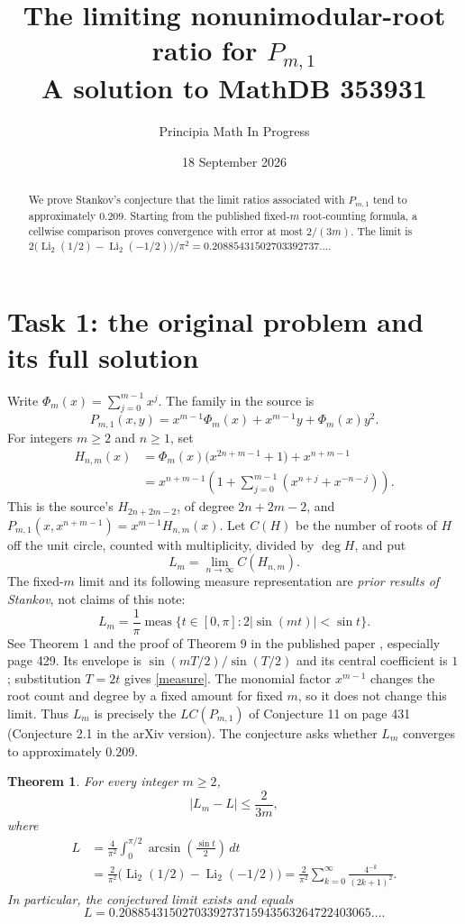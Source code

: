 \documentclass[11pt]{article}
\title{The limiting nonunimodular-root ratio for $P_{m,1}$\\
\large A solution to MathDB 353931}
\author{Principia Math In Progress}
\date{18 September 2026}
\newtheorem{theorem}{Theorem}
\newcommand{\meas}{\operatorname{meas}}
\newcommand{\Li}{\operatorname{Li}_2}
\begin{document}
\maketitle
\begin{abstract}
We prove Stankov's conjecture that the limit ratios associated with
$P_{m,1}$ tend to approximately $0.209$. Starting from the published
fixed-$m$ root-counting formula, a cellwise comparison proves convergence
with error at most $2/(3m)$. The limit is
$2\bigl(\Li(1/2)-\Li(-1/2)\bigr)/\pi^2
=0.20885431502703392737\ldots$.
\end{abstract}

\section*{Task 1: the original problem and its full solution}
Write $\Phi_m(x)=\sum_{j=0}^{m-1}x^j$. The family in the source is
\[
 P_{m,1}(x,y)=x^{m-1}\Phi_m(x)+x^{m-1}y+\Phi_m(x)y^2.
\]
For integers $m\geq2$ and $n\geq1$, set
\begin{align*}
 H_{n,m}(x)
 &=\Phi_m(x)\bigl(x^{2n+m-1}+1\bigr)+x^{n+m-1}\\
 &=x^{n+m-1}\left(1+\sum_{j=0}^{m-1}
                 (x^{n+j}+x^{-n-j})\right).
\end{align*}
This is the source's $H_{2n+2m-2}$, of degree $2n+2m-2$, and
$P_{m,1}(x,x^{n+m-1})=x^{m-1}H_{n,m}(x)$.
Let $C(H)$ be the number of roots of $H$ off the unit circle,
counted with multiplicity, divided by $\deg H$, and put
\[
 L_m=\lim_{n\to\infty}C(H_{n,m}).
\]
The fixed-$m$ limit and its following measure representation are
\emph{prior results of Stankov}, not claims of this note:
\begin{equation}\label{measure}
 L_m=\frac1\pi\meas\{t\in[0,\pi]:2|\sin(mt)|<\sin t\}.
\end{equation}
See Theorem 1 and the proof of Theorem 9 in the published paper
\cite{S}, especially page 429. Its envelope is
$\sin(mT/2)/\sin(T/2)$ and its central coefficient is $1$;
substitution $T=2t$ gives \eqref{measure}.
The monomial factor $x^{m-1}$ changes the root count and degree
by a fixed amount for fixed $m$, so it does not change this limit.
Thus $L_m$ is precisely the $LC(P_{m,1})$ of Conjecture 11
on page 431 (Conjecture 2.1 in the arXiv version).
The conjecture asks whether $L_m$ converges to approximately $0.209$.

\begin{theorem}\label{main}
For every integer $m\geq2$,
\begin{equation}\label{error}
 |L_m-L|\leq\frac{2}{3m},
\end{equation}
where
\begin{align}
 L&=\frac{4}{\pi^2}\int_0^{\pi/2}
                    \arcsin\!\left(\frac{\sin t}{2}\right)\,dt
       \label{integral}\\
  &=\frac{2}{\pi^2}\bigl(\Li(1/2)-\Li(-1/2)\bigr)
   =\frac{2}{\pi^2}\sum_{k=0}^{\infty}
                    \frac{4^{-k}}{(2k+1)^2}.
       \label{value}
\end{align}
In particular, the conjectured limit exists and equals
\[
 L=0.2088543150270339273715943563264722403065\ldots.
\]
\end{theorem}
\end{document}
